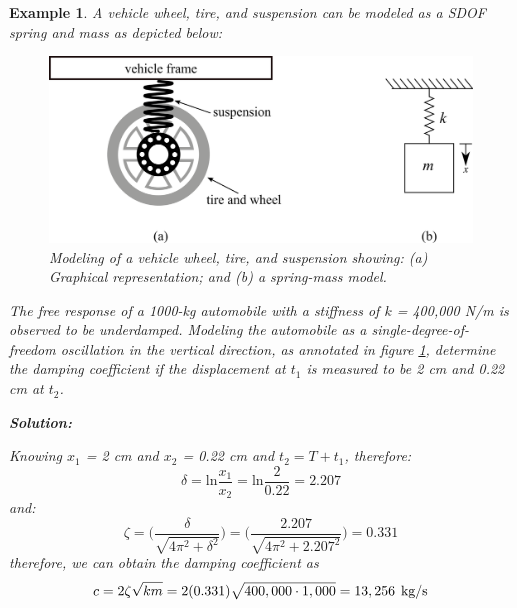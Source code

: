 \documentclass[12pt,letter]{article}
\newtheorem{ex}{Example}
\numberwithin{ex}{section} %
\newenvironment{example}{\begin{mdframed}[middlelinewidth=0.5mm]\begin{ex}\normalfont}{\end{ex}\end{mdframed}}
\numberwithin{re}{section} %
\numberwithin{equation}{section}	%
\begin{document}
	
\begin{example}

			A vehicle wheel, tire, and suspension can be modeled as a SDOF spring and mass as depicted below: %
			
			\begin{figure}[H]
				\centering
				\includegraphics[width=1\linewidth]{../figures/Vehicle_wheel_undamped.png}
				\caption{Modeling of a vehicle wheel, tire, and suspension showing: (a) Graphical representation; and (b) a spring-mass model.}
				\label{fig:vehicle_wheel_undamped}
			\end{figure}	
			
			The free response of a 1000-kg automobile with a stiffness of $k$ = 400,000 N/m is observed to be underdamped. Modeling the automobile as a single-degree-of-freedom oscillation in the vertical direction, as annotated in figure \ref{fig:vehicle_wheel_undamped}, determine the damping coefficient if the displacement at $t_1$ is measured to be 2 cm and 0.22 cm at $t_2$.

			\noindent\textbf{Solution:} 
						
			Knowing $x_1$ = 2 cm and $x_2$ = 0.22 cm and $t_2 = T + t_1$, therefore:
			\begin{equation}
				\delta = \text{ln}\frac{x_1}{x_2} = \text{ln}\frac{2}{0.22} = 2.207
			\end{equation}			
			and:
			\begin{equation}
				\zeta = \bigg(\frac{\delta}{\sqrt{4\pi^2+\delta^2}}\bigg) = \bigg(\frac{2.207}{\sqrt{4\pi^2+2.207^2}}\bigg) = 0.331
			\end{equation}
			therefore, we can obtain the damping coefficient as
			\begin{equation}
				c = 2\zeta\sqrt{km}=2(0.331)\sqrt{400,000 \cdot 1,000} = 13,256 \hspace{1ex} 
				\text{kg/s} 
			\end{equation}	

\end{example}














	\pagebreak
	\renewcommand{\thepage}{}
	\renewcommand\refname{References Cited}
	\pagestyle{plain}
	
	
\end{document}
